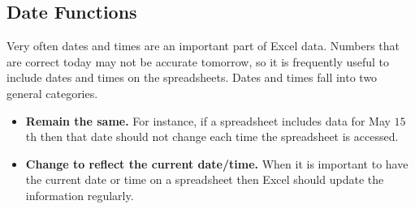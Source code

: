 %

\subsection{Date Functions}

Very often dates and times are an important part of Excel data. Numbers that are correct today may not be accurate tomorrow, so it is frequently useful to include dates and times on the spreadsheets. Dates and times fall into two general categories.

\begin{itemize}
	\item \textbf{Remain the same.} For instance, if a spreadsheet includes data for May $ 15 $th then that date should not change each time the spreadsheet is accessed.
	\item \textbf{Change to reflect the current date/time.} When it is important to have the current date or time on a spreadsheet then Excel should update the information regularly.
\end{itemize}

